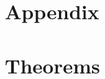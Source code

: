 \documentclass[smallextended]{svjour3}       %
\newcommand{\kastar}{kA$^*$\xspace}
\newcommand{\open}{\textsc{Open}\xspace}
\newcommand{\axiomcons}{consistent\xspace}
\newcommand{\vect}[1]{\mathbf{#1}}
\begin{document}







%
%




\section*{Appendix}
\appendix

\section{Theorems}
\label{sec:appendix-proofs}


\end{document}
